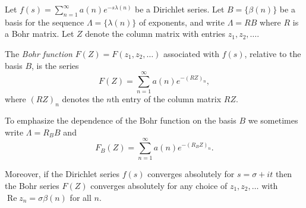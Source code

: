 Let $f(s) = \sum_{n=1}^{\infty} a(n)e^{-s\lambda(n)}$ be a Dirichlet series. Let $B = \{\beta(n)\}$ be a basis for the sequence $\Lambda = \{\lambda(n)\}$ of exponents, and write $\Lambda = RB$ where $R$ is a Bohr matrix. Let $Z$ denote the column matrix with entries $z_1, z_2, \ldots$.

The \textit{Bohr function} $F(Z) = F(z_1, z_2, \ldots)$ associated with $f(s)$, relative to the basis $B$, is the series
$$F(Z) = \sum_{n=1}^{\infty} a(n)e^{-(RZ)_n},$$
where $(RZ)_n$ denotes the $n$th entry of the column matrix $RZ$.

To emphasize the dependence of the Bohr function on the basis $B$ we sometimes write $\Lambda = R_B B$ and
$$F_B(Z) = \sum_{n=1}^{\infty} a(n)e^{-(R_B Z)_n}.$$

Moreover, if the Dirichlet series $f(s)$ converges absolutely for $s = \sigma + it$ then the Bohr series $F(Z)$ converges absolutely for any choice of $z_1, z_2, \ldots$ with $\operatorname{Re} z_n = \sigma \beta(n)$ for all $n$.
